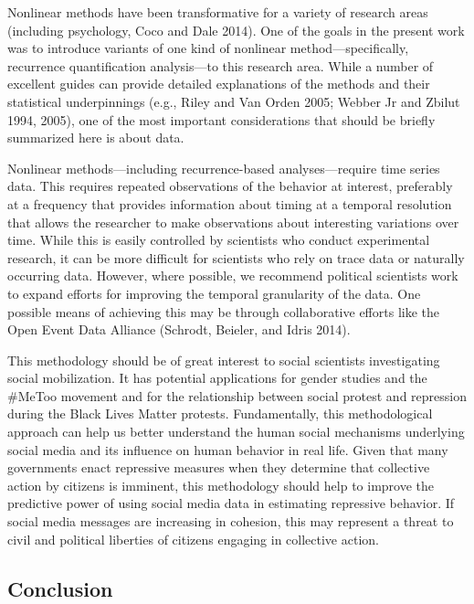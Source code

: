 \documentclass[
  english,
  man]{apa6}
\begin{document}
Nonlinear methods have been transformative for a variety of research areas
(including psychology, Coco and Dale 2014). One of the goals in the present work was
to introduce variants of one kind of nonlinear method---specifically, recurrence
quantification analysis---to this research area. While a number of excellent
guides can provide detailed explanations of the methods and their statistical
underpinnings (e.g., Riley and Van Orden 2005; Webber Jr and Zbilut 1994, 2005), one of the most important considerations that should be
briefly summarized here is about data.

Nonlinear methods---including recurrence-based analyses---require time series
data. This requires repeated observations of the behavior at interest,
preferably at a frequency that provides information about timing at a temporal
resolution that allows the researcher to make observations about interesting
variations over time. While this is easily controlled by scientists who conduct
experimental research, it can be more difficult for scientists who rely on trace
data or naturally occurring data. However, where possible, we recommend
political scientists work to expand efforts for improving the temporal
granularity of the data. One possible means of achieving this may be through
collaborative efforts like the Open Event Data Alliance (Schrodt, Beieler, and Idris 2014).

This methodology should be of great interest to social scientists investigating
social mobilization. It has potential applications for gender studies and
the \#MeToo movement and for the relationship between social protest and repression
during the Black Lives Matter protests. Fundamentally, this methodological
approach can help us better understand the human social mechanisms underlying
social media and its influence on human behavior in real life. Given that many
governments enact repressive measures when they determine that collective action
by citizens is imminent, this methodology should help to improve the predictive
power of using social media data in estimating repressive behavior. If social
media messages are increasing in cohesion, this may represent a threat to civil
and political liberties of citizens engaging in collective action.

\hypertarget{conclusion}{%
\subsection{Conclusion}\label{conclusion}}
\end{document}
